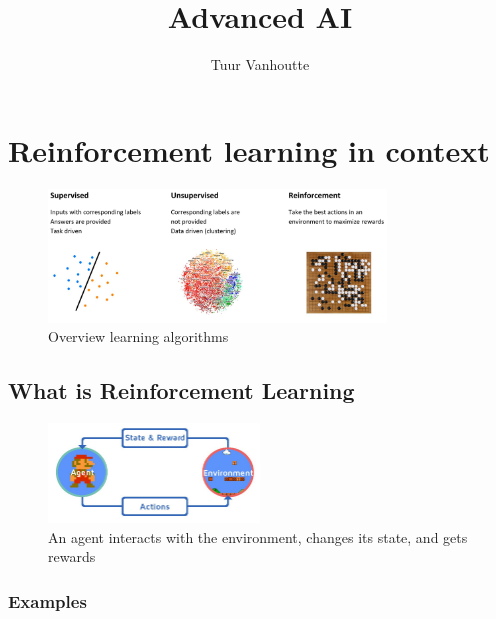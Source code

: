 \documentclass{article}
\begin{document}
\begin{titlepage}
    \author{Tuur Vanhoutte}
    \title{Advanced AI}
\end{titlepage}

\maketitle
\newpage
\tableofcontents
\newpage


\section{Reinforcement learning in context}

\begin{figure}[H]
    \centering
    \includegraphics[width=0.8\textwidth]{img/leeralgoritmes.png}
    \caption{Overview learning algorithms}
\end{figure}


\subsection{What is Reinforcement Learning}

\begin{figure}[H]
    \centering
    \includegraphics[width=0.5\textwidth]{img/reinforcement-learning-mario.png}
    \caption{An agent interacts with the environment, changes its state, and gets rewards}
\end{figure}

\subsubsection{Examples}
\end{document}
